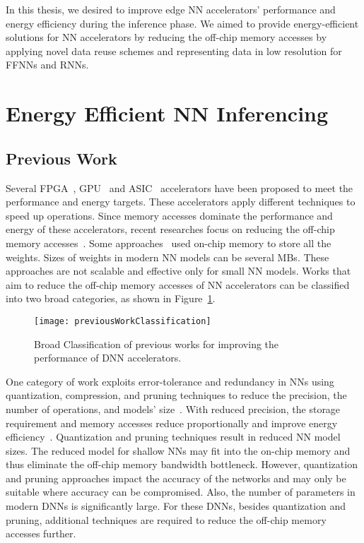 In this thesis, we desired to improve edge NN accelerators' performance and energy efficiency during the inference phase. We aimed to provide energy-efficient solutions for NN accelerators by reducing the off-chip memory accesses by applying novel data reuse schemes and representing data in low resolution for FFNNs and RNNs.

\section{Energy Efficient NN Inferencing}
\subsection{Previous Work}
Several FPGA~\cite{zhang2015optimizing,wei2019overcoming,gokhale2014240,8742284,gupta2015deep,alwani2016fused}, GPU~\cite{chetlur2014cudnn} and ASIC~\cite{Chen2016EyerissAS,chen2014diannao,chen2014dadiannao,du2015shidiannao} accelerators have been proposed to meet the performance and energy targets. These accelerators apply different techniques to speed up operations. Since memory accesses dominate the performance and energy of these accelerators, recent researches focus on reducing the off-chip memory accesses~\cite{chen2014diannao,chen2016eyeriss,zhang2015optimizing}. Some approaches~\cite{lee2016fpga, rybalkin2018finn, ferreira2016fpga} used on-chip memory to store all the weights. Sizes of weights in modern NN models can be several MBs. These approaches are not scalable and effective only for small NN models. 
Works that aim to reduce the off-chip memory accesses of NN accelerators can be classified into two broad categories, as shown in Figure~\ref{fig:previousWorkClassification}. 
\begin{figure}[!htb]
	\centering
	\captionsetup{font=sf}
	\texttt{[image: previousWorkClassification]}
	\caption{Broad Classification of previous works for improving the performance of DNN accelerators.}
	\label{fig:previousWorkClassification}
\end{figure}

One category of work exploits error-tolerance and redundancy in NNs using quantization, compression, and pruning techniques to reduce the precision, the number of operations, and models' size~\cite{ferreira2016fpga,wang2018c,chang2015recurrent,han2017ese,lee2016fpga}. With reduced precision, the storage requirement and memory accesses reduce proportionally and improve energy efficiency~\cite{sze2017efficient}. Quantization and pruning techniques result in reduced NN model sizes. The reduced model for shallow NNs may fit into the on-chip memory and thus eliminate the off-chip memory bandwidth bottleneck. However, quantization and pruning approaches impact the accuracy of the networks and may only be suitable where accuracy can be compromised. Also, the number of parameters in modern DNNs is significantly large. For these DNNs, besides quantization and pruning, additional techniques are required to reduce the off-chip memory accesses further.


